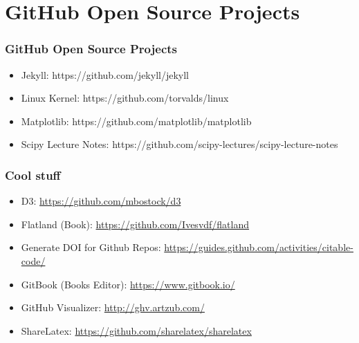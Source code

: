 \section[Open Source]{GitHub Open Source Projects}
\begin{frame}
    \frametitle{GitHub Open Source Projects}
    
\begin{itemize}    
	\item Jekyll: https://github.com/jekyll/jekyll \pause
        
    \item Linux Kernel: https://github.com/torvalds/linux \pause
    
    \item Matplotlib: https://github.com/matplotlib/matplotlib\pause
        
    \item Scipy Lecture Notes: https://github.com/scipy-lectures/scipy-lecture-notes
    
\end{itemize}   

\end{frame}


\begin{frame}
    \frametitle{Cool stuff}
    
    \begin{itemize}
    \item D3: \url{https://github.com/mbostock/d3} \pause
    
    \item Flatland (Book): \url{https://github.com/Ivesvdf/flatland} \pause
    
    \item Generate DOI for Github Repos: \url{https://guides.github.com/activities/citable-code/} \pause 

    \item GitBook (Books Editor): \url{https://www.gitbook.io/} \pause
     
    \item GitHub Visualizer: \url{http://ghv.artzub.com/} \pause
       
    \item ShareLatex: \url{https://github.com/sharelatex/sharelatex}
    \end{itemize}
\end{frame}

